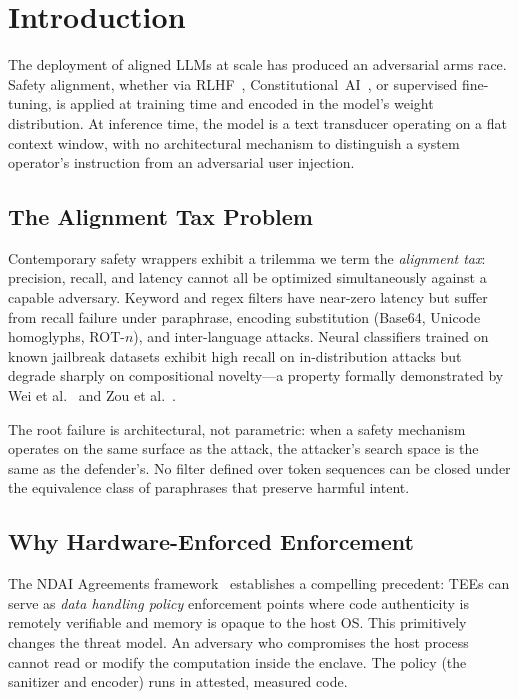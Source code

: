 \documentclass[sigconf,natbib=false]{acmart}
\begin{document}
\section{Introduction}
\label{sec:intro}

The deployment of aligned LLMs at scale has produced an adversarial arms race.
Safety alignment, whether via RLHF~\cite{ouyang2022training},
Constitutional~AI~\cite{bai2022constitutional}, or supervised fine-tuning,
is applied at training time and encoded in the model's weight distribution.
At inference time, the model is a text transducer operating on a flat context
window, with no architectural mechanism to distinguish a system operator's
instruction from an adversarial user injection.

\subsection{The Alignment Tax Problem}
\label{sec:intro:tax}

Contemporary safety wrappers exhibit a trilemma we term the \emph{alignment
tax}: precision, recall, and latency cannot all be optimized simultaneously
against a capable adversary. Keyword and regex filters have near-zero latency
but suffer from recall failure under paraphrase, encoding substitution
(Base64, Unicode homoglyphs, ROT-$n$), and inter-language attacks. Neural
classifiers trained on known jailbreak datasets exhibit high recall on
in-distribution attacks but degrade sharply on compositional novelty—a
property formally demonstrated by Wei et al.~\cite{wei2023jailbroken} and
Zou et al.~\cite{zou2023universal}.

The root failure is architectural, not parametric: when a safety mechanism
operates on the same surface as the attack, the attacker's search space is
the same as the defender's. No filter defined over token sequences can be
closed under the equivalence class of paraphrases that preserve harmful
intent.

\subsection{Why Hardware-Enforced Enforcement}
\label{sec:intro:hw}

The NDAI Agreements framework~\cite{ndai2024tee} establishes a compelling
precedent: TEEs can serve as \emph{data handling policy} enforcement points
where code authenticity is remotely verifiable and memory is opaque to the
host OS. This primitively changes the threat model. An adversary who
compromises the host process cannot read or modify the computation inside the
enclave. The policy (the sanitizer and encoder) runs in attested, measured
code.
\end{document}
